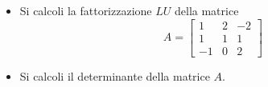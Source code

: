 \begin{itemize}
\item Si calcoli la fattorizzazione $LU$ della matrice
\[
A=\left[
\begin{array}{ccc}
1 & 2 & -2 \\
1 & 1 & 1\\
-1 & 0 & 2
\end{array}\right]
\]
\item
Si calcoli il determinante della matrice $A$.
\end {itemize}
